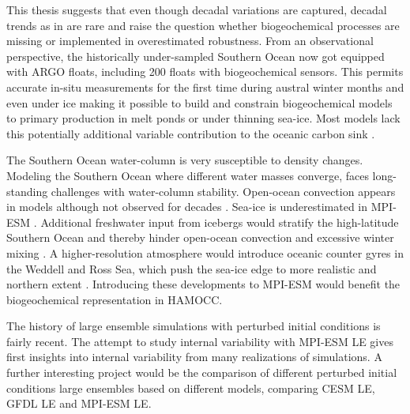 This thesis suggests that even though decadal variations are captured, decadal trends as in \cite{landschuetzer2015} are rare and raise the question whether biogeochemical processes are missing or implemented in overestimated robustness. From an observational perspective, the historically under-sampled Southern Ocean now got equipped with ARGO floats, including 200 floats with biogeochemical sensors. This permits accurate in-situ measurements for the first time during austral winter months and even under ice making it possible to build and constrain biogeochemical models to primary production in melt ponds or under thinning sea-ice. Most models lack this potentially additional variable contribution to the oceanic carbon sink \citep{Long2015,Williams2017,Horvat2017}.

The Southern Ocean water-column is very susceptible to density changes. Modeling the Southern Ocean where different water masses converge, faces long-standing challenges with water-column stability. Open-ocean convection appears in models although not observed for decades \citep{deLavergne2014,Stoessel2015}. Sea-ice is underestimated in \acs{MPI-ESM} \citep{Jungclaus2013,Notz2013}. Additional freshwater input from icebergs would stratify the high-latitude Southern Ocean and thereby hinder open-ocean convection and excessive winter mixing \citep{Sallee2013,Stoessel2015}. A higher-resolution atmosphere would introduce oceanic counter gyres in the Weddell and Ross Sea, which push the sea-ice edge to more realistic and northern extent \citep{Stoessel2015}. Introducing these developments to \acs{MPI-ESM} would benefit the biogeochemical representation in \acs{HAMOCC}.\newline

\label{sec:outlook}
The history of large ensemble simulations with perturbed initial conditions is fairly recent. The attempt to study internal variability with \acs{MPI-ESM LE} gives first insights into internal variability from many realizations of simulations. A further interesting project would be the comparison of different perturbed initial conditions large ensembles based on different models, \ie comparing \acs{CESM} \acs{LE}, \acs{GFDL} \acs{LE} and \acs{MPI-ESM LE}. 

